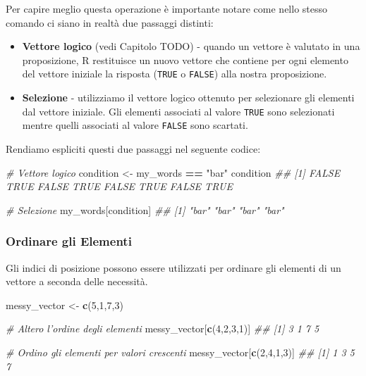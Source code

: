 \documentclass[
]{book}
\newenvironment{Shaded}{\begin{snugshade}}{\end{snugshade}}
\newcommand{\CommentTok}[1]{\textcolor[rgb]{0.56,0.35,0.01}{\textit{#1}}}
\newcommand{\DecValTok}[1]{\textcolor[rgb]{0.00,0.00,0.81}{#1}}
\newcommand{\KeywordTok}[1]{\textcolor[rgb]{0.13,0.29,0.53}{\textbf{#1}}}
\newcommand{\NormalTok}[1]{#1}
\newcommand{\OperatorTok}[1]{\textcolor[rgb]{0.81,0.36,0.00}{\textbf{#1}}}
\newcommand{\StringTok}[1]{\textcolor[rgb]{0.31,0.60,0.02}{#1}}
\providecommand{\tightlist}{%
  \setlength{\itemsep}{0pt}\setlength{\parskip}{0pt}}
\begin{document}
Per capire meglio questa operazione è importante notare come nello stesso comando ci siano in realtà due passaggi distinti:

\begin{itemize}
\tightlist
\item
  \textbf{Vettore logico} (vedi Capitolo TODO) - quando un vettore è valutato in una proposizione, R restituisce un nuovo vettore che contiene per ogni elemento del vettore iniziale la risposta (\texttt{TRUE} o \texttt{FALSE}) alla nostra proposizione.
\item
  \textbf{Selezione} - utilizziamo il vettore logico ottenuto per selezionare gli elementi dal vettore iniziale. Gli elementi associati al valore \texttt{TRUE} sono selezionati mentre quelli associati al valore \texttt{FALSE} sono scartati.
\end{itemize}

Rendiamo espliciti questi due passaggi nel seguente codice:

\begin{Shaded}
\begin{Highlighting}[]
\CommentTok{# Vettore logico}
\NormalTok{condition <-}\StringTok{ }\NormalTok{my_words }\OperatorTok{==}\StringTok{ "bar"}
\NormalTok{condition}
\CommentTok{## [1] FALSE  TRUE FALSE  TRUE FALSE  TRUE FALSE  TRUE}

\CommentTok{# Selezione}
\NormalTok{my_words[condition]}
\CommentTok{## [1] "bar" "bar" "bar" "bar"}
\end{Highlighting}
\end{Shaded}

\hypertarget{ordinare-gli-elementi}{%
\subsubsection*{Ordinare gli Elementi}\label{ordinare-gli-elementi}}

Gli indici di posizione possono essere utilizzati per ordinare gli elementi di un vettore a seconda delle necessità.

\begin{Shaded}
\begin{Highlighting}[]
\NormalTok{messy_vector <-}\StringTok{ }\KeywordTok{c}\NormalTok{(}\DecValTok{5}\NormalTok{,}\DecValTok{1}\NormalTok{,}\DecValTok{7}\NormalTok{,}\DecValTok{3}\NormalTok{)}

\CommentTok{# Altero l'ordine degli elementi}
\NormalTok{messy_vector[}\KeywordTok{c}\NormalTok{(}\DecValTok{4}\NormalTok{,}\DecValTok{2}\NormalTok{,}\DecValTok{3}\NormalTok{,}\DecValTok{1}\NormalTok{)]}
\CommentTok{## [1] 3 1 7 5}

\CommentTok{# Ordino gli elementi per valori crescenti}
\NormalTok{messy_vector[}\KeywordTok{c}\NormalTok{(}\DecValTok{2}\NormalTok{,}\DecValTok{4}\NormalTok{,}\DecValTok{1}\NormalTok{,}\DecValTok{3}\NormalTok{)]}
\CommentTok{## [1] 1 3 5 7}
\end{Highlighting}
\end{Shaded}
\end{document}
